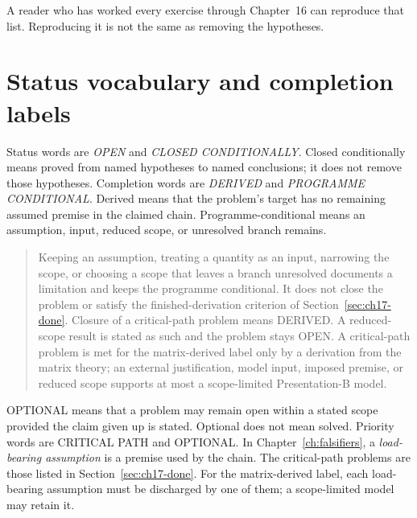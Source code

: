 A reader who has worked every exercise through Chapter~16 can
reproduce that list. Reproducing it is not the same as removing
the hypotheses.

\section{Status vocabulary and completion labels}
\label{sec:ch17-labels}

Status words are \emph{OPEN} and \emph{CLOSED CONDITIONALLY}.
Closed conditionally means proved from named hypotheses to named
conclusions; it does not remove those hypotheses. Completion words
are \emph{DERIVED} and \emph{PROGRAMME CONDITIONAL}. Derived means
that the problem's target has no remaining assumed premise in the
claimed chain. Programme-conditional means an assumption, input,
reduced scope, or unresolved branch remains.

\begin{quote}
Keeping an assumption, treating a quantity as an input, narrowing
the scope, or choosing a scope that leaves a branch unresolved
documents a limitation and keeps the programme conditional. It does
not close the problem or satisfy the finished-derivation criterion
of Section~\ref{sec:ch17-done}. Closure of a critical-path problem
means DERIVED. A reduced-scope result is stated as such and the
problem stays OPEN. A critical-path problem is met for the
matrix-derived label only by a derivation from the matrix theory; an
external justification, model input, imposed premise, or reduced
scope supports at most a scope-limited Presentation-B model.
\end{quote}

OPTIONAL means that a problem may remain open within a stated scope
provided the claim given up is stated. Optional does not mean solved.
Priority words are CRITICAL PATH and OPTIONAL.
In Chapter~\ref{ch:falsifiers}, a \emph{load-bearing assumption} is a
premise used by the chain. The critical-path problems are those
listed in Section~\ref{sec:ch17-done}. For the matrix-derived label,
each load-bearing assumption must be discharged by one of them; a
scope-limited model may retain it.

